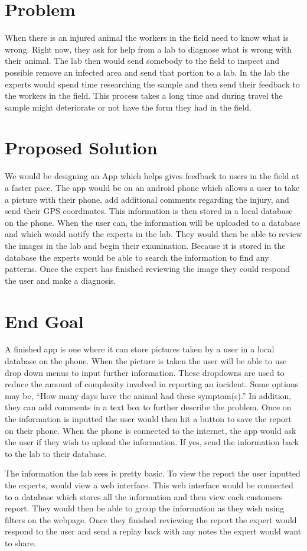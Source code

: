 \documentclass[onecolumn, draftclsnofoot,10pt, compsoc]{IEEEtran}
\begin{document}
\section{Problem}
 	When there is an injured animal the workers in the field need to know what is wrong.
	Right now, they ask for help from a lab to diagnose what is wrong with their animal.
	The lab then would send somebody to the field to inspect and possible remove an infected area and send that portion to a lab.
	In the lab the experts would spend time researching the sample and then send their feedback to the workers in the field.
	This process takes a long time and during travel the sample might deteriorate or not have the form they had in the field.  
\section{Proposed Solution}
	We would be designing an App which helps gives feedback to users in the field at a faster pace.
	The app would be on an android phone which allows a user to take a picture with their phone, add additional comments regarding the injury, and send their GPS coordinates.
	This information is then stored in a local database on the phone.
	When the user can, the information will be uploaded to a database and which would notify the experts in the lab.
	They would then be able to review the images in the lab and begin their examination.
	Because it is stored in the database the experts would be able to search the information to find any patterns.
	Once the expert has finished reviewing the image they could respond the user and make a diagnosis. 

\section{End Goal}
	A finished app is one where it can store pictures taken by a user in a local database on the phone.
	When the picture is taken the user will be able to use drop down menus to input further information.
	These dropdowns are used to reduce the amount of complexity involved in reporting an incident.
	Some options may be, “How many days have the animal had these symptom(s).” 
	In addition, they can add comments in a text box to further describe the problem.
	Once on the information is inputted the user would then hit a button to save the report on their phone.
	When the phone is connected to the internet, the app would ask the user if they wish to upload the information.
	If yes, send the information back to the lab to their database.

	The information the lab sees is pretty basic.
	To view the report the user inputted the experts, would view a web interface.
	This web interface would be connected to a database which stores all the information and then view each customers report.
	They would then be able to group the information as they wish using filters on the webpage.
	Once they finished reviewing the report the expert would respond to the user and send a replay back with any notes the expert would want to share. 
 
\end{document}

